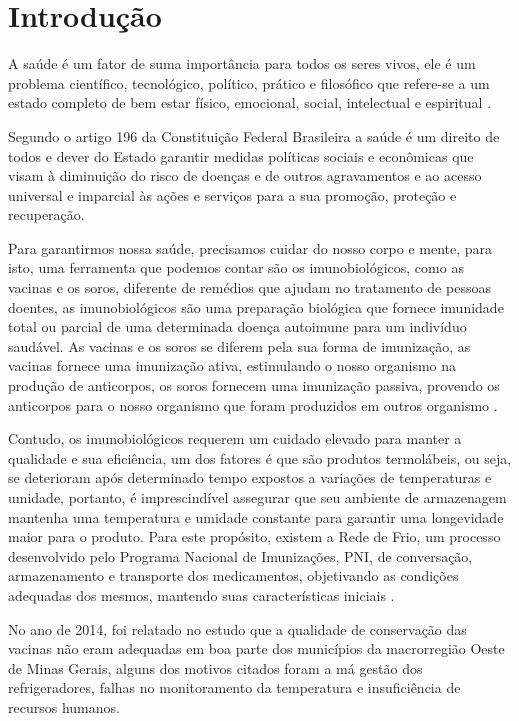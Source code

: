 \chapter[Introdução]{Introdução}
\label{cap:intro}

A saúde é um fator de suma importância para todos os seres vivos, ele é um problema científico, tecnológico, político, prático e filosófico que refere-se a um estado completo de bem estar físico, emocional, social, intelectual e espiritual \cite{almeida2011saude}. 

Segundo o artigo 196 \cite{de2013direito} da Constituição Federal Brasileira a saúde é um direito de todos e dever do Estado garantir medidas políticas sociais e econômicas que visam à diminuição do risco de doenças e de outros agravamentos e ao acesso universal e imparcial às ações e serviços para a sua promoção, proteção e recuperação.

Para garantirmos nossa saúde, precisamos cuidar do nosso corpo e mente, para isto, uma ferramenta que podemos contar são os imunobiológicos, como as vacinas e os soros, diferente de remédios que ajudam no tratamento de pessoas doentes, as imunobiológicos são uma preparação biológica que fornece imunidade total ou parcial de uma determinada doença autoimune para um indivíduo saudável. As vacinas e os soros se diferem pela sua forma de imunização, as vacinas fornece uma imunização ativa, estimulando o nosso organismo na produção de anticorpos, os soros fornecem uma imunização passiva, provendo os anticorpos para o nosso organismo que foram produzidos  em outros organismo \cite{soma2018tratamento}.

Contudo, os imunobiológicos requerem um cuidado elevado para manter a qualidade e sua eficiência, um dos fatores é que são produtos termolábeis, ou seja, se deterioram após determinado tempo expostos a variações de temperaturas e umidade, portanto, é imprescindível assegurar que seu ambiente de armazenagem mantenha uma temperatura e umidade constante \cite{ministerio2001manual} para garantir uma longevidade maior para o produto. Para este propósito, existem a Rede de Frio, um processo desenvolvido pelo Programa Nacional de Imunizações, PNI, de conversação, armazenamento e transporte dos medicamentos, objetivando as condições adequadas dos mesmos, mantendo suas características iniciais \cite{ministerio2001manual}.

No ano de 2014, foi relatado no estudo \cite{oliveira2014avaliaccao} que a qualidade de conservação das vacinas não eram adequadas em boa parte dos municípios da macrorregião Oeste de Minas Gerais, alguns dos motivos citados foram a má gestão dos refrigeradores, falhas no monitoramento da temperatura e insuficiência de recursos humanos. 

